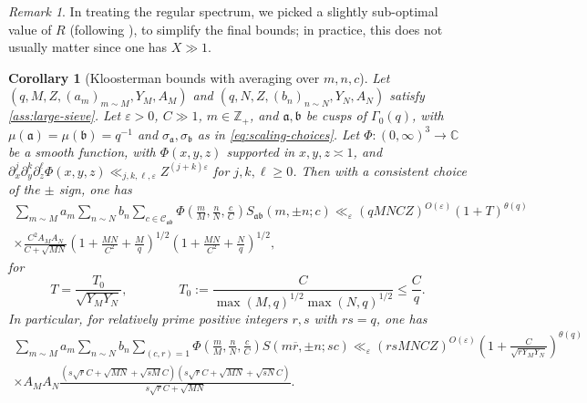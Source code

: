\documentclass[reqno,11pt]{amsart}
\newtheorem{corollary}[theorem]{Corollary}
\theoremstyle{remark}
\newtheorem*{remark}{Remark}
\numberwithin{equation}{section}
\newcommand{\Z}{\mathbb{Z}}
\newcommand{\C}{\mathbb{C}}
\newcommand{\mC}{\mathcal{C}}
\newcommand{\ma}{\mathfrak{a}}
\newcommand{\mb}{\mathfrak{b}}
\newcommand{\eps}{\varepsilon}
\renewcommand{\bar}{\overline}
\begin{document}
\begin{remark}
In treating the regular spectrum, we picked a slightly sub-optimal value of $R$ (following \cite[p.\,268]{deshouillers1982kloosterman}), to simplify the final bounds; in practice, this does not usually matter since one has $X \gg 1$.
\end{remark}




\begin{corollary}[Kloosterman bounds with averaging over $m, n, c$] \label{cor:kloosterman-averaging-mnc}
Let $(q, M, Z, (a_m)_{m \sim M}, Y_M, A_M)$ and $(q, N, Z, (b_n)_{n \sim N}, Y_N, A_N)$ satisfy \cref{ass:large-sieve}. Let $\eps > 0$, $C \gg 1$, $m \in \Z_+$, and $\ma, \mb$ be cusps of $\Gamma_0(q)$, with $\mu(\ma) = \mu(\mb) = q^{-1}$ and $\sigma_{\ma}, \sigma_{\mb}$ as in \cref{eq:scaling-choices}. Let $\Phi : (0, \infty)^3 \to \C$ be a smooth function, with $\Phi(x, y, z)$ supported in $x, y, z \asymp 1$, and $\partial_x^j \partial_y^k \partial_z^\ell \Phi(x, y, z) \ll_{j,k,\ell,\eps} Z^{(j+k)\eps}$ for $j, k, \ell \ge 0$. Then with a consistent choice of the $\pm$ sign, one has 
\begin{equation} \label{eq:kloosterman-mnc}
\begin{aligned}
    \sum_{m \sim M} a_m
    \sum_{n \sim N} b_n
    \sum_{c \in \mC_{\ma\mb}} \Phi\left(\frac{m}{M}, \frac{n}{N}, \frac{c}{C}\right) S_{\ma\mb}(m, \pm n; c)
    \ll_\eps
    (qMNCZ)^{O(\eps)}
    \left(1 + T\right)^{\theta(q)}
    \\
    \times 
    \frac{C^2 A_M A_N}{C + \sqrt{MN}} 
    \left(1 + \frac{MN}{C^2} + \frac{M}{q} \right)^{1/2}
    \left(1 + \frac{MN}{C^2} + \frac{N}{q}\right)^{1/2},
\end{aligned}
\end{equation}
for
\[
    T = \frac{T_0}{\sqrt{Y_M Y_N}}, 
    \qquad\qquad 
    T_0 := \frac{C}{\max\left(M, q \right)^{1/2}\max\left(N, q\right)^{1/2}}
    \le
    \frac{C}{q}.
\]
In particular, for relatively prime positive integers $r, s$ with $rs = q$, one has
\begin{equation} \label{eq:kloosterman-mnc-explicit}
\begin{aligned}
    \sum_{m \sim M} a_m
    \sum_{n \sim N} b_n
    \sum_{(c, r) = 1} \Phi\left(\frac{m}{M}, \frac{n}{N}, \frac{c}{C}\right) S(m\bar{r}, \pm n; sc)
    \ll_\eps
    (rsMNCZ)^{O(\eps)} \left(1 + \frac{C}{\sqrt{r Y_M Y_N}} \right)^{\theta(q)}
    \\
    \times
    A_M A_N
    \frac{\left(s\sqrt{r}C + \sqrt{MN} + \sqrt{sM} C\right)\left(s\sqrt{r}C + \sqrt{MN} + \sqrt{sN} C\right)}{s\sqrt{r}C + \sqrt{MN}}.
\end{aligned}
\end{equation}
\end{corollary}
\end{document}
